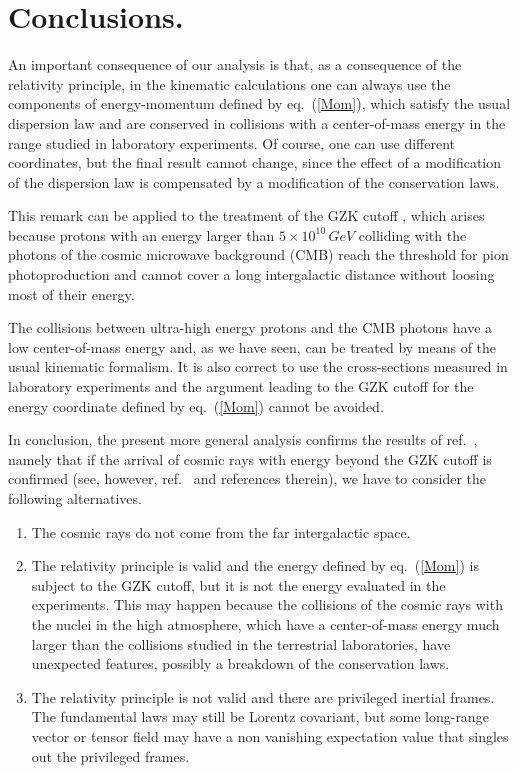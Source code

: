 \documentclass[a4paper,12pt]{article}
\begin{document}
\section{Conclusions.}

An important consequence of our analysis is that, as a consequence of the relativity principle, in the kinematic calculations one can always use the components of energy-momentum defined by eq.\ (\ref{Mom}), which satisfy the usual dispersion law and are conserved in collisions with a center-of-mass energy in the range studied in laboratory experiments. Of course, one can use different coordinates, but the final result cannot change, since the effect of a modification of the dispersion law is compensated by a modification of the conservation laws.

This remark can be applied to the treatment of the GZK cutoff \cite{ZK,Greisen}, which arises because protons with an energy larger than $5 \times 10^{10} \, GeV$ colliding with the photons of the cosmic microwave background (CMB) reach the threshold for pion photoproduction and cannot cover a long intergalactic distance without loosing most of their energy.

The collisions between ultra-high energy protons and the CMB photons have a low center-of-mass energy and, as we have seen, can be treated by means of the usual kinematic formalism. It is also correct to use the cross-sections measured in laboratory experiments and the argument leading to the GZK cutoff for the energy coordinate defined by eq.\ (\ref{Mom}) cannot be avoided.

In conclusion, the present more general analysis confirms  the results of ref.\ \cite{Toller}, namely that if the arrival of cosmic rays with energy beyond the GZK cutoff \cite{Takeda} is confirmed (see, however, ref.\ \cite{BW} and references therein), we have to consider the following alternatives.
\renewcommand{\labelenumi}{\Alph{enumi})}
\begin{enumerate}
\item The cosmic rays do not come from the far intergalactic space.
\item The relativity principle is valid and the energy defined by eq.\ (\ref{Mom}) is subject to the GZK cutoff, but it is not the energy evaluated in the experiments. This may happen because the collisions of the cosmic rays with the nuclei in the high atmosphere, which have a center-of-mass energy much larger than the collisions studied in the terrestrial laboratories, have unexpected features, possibly a breakdown of the conservation laws.
\item  The relativity principle is not valid and there are privileged inertial frames. The fundamental laws may still be Lorentz covariant, but some long-range vector or tensor field may have a non vanishing expectation value that singles out the privileged frames.
\end{enumerate}
\end{document}
